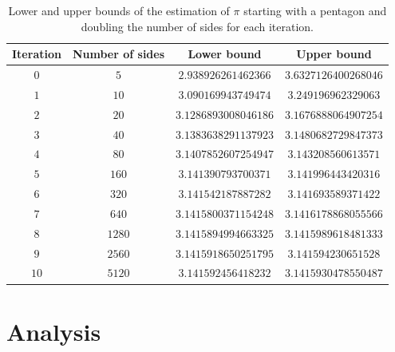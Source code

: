 \documentclass{article}
\begin{document}
\begin{table}[ht]
    \centering
    \begin{tabular}{ |c|c|c|c| }
    \hline
        Iteration&Number of sides&Lower bound&Upper bound \\
        \hline
        $0$ & $5$ & $2.938926261462366$ & $3.6327126400268046$ \\
        \hline
        $1$ & $10$ & $3.090169943749474$ & $3.249196962329063$ \\
        \hline
        $2$ & $20$ & $3.1286893008046186$ & $3.1676888064907254$ \\
        \hline
        $3$ & $40$ & $3.1383638291137923$ & $3.1480682729847373$ \\
        \hline
        $4$ & $80$ & $3.1407852607254947$ & $3.143208560613571$ \\
        \hline
        $5$ & $160$ & $3.141390793700371$ & $3.141996443420316$ \\
        \hline
        $6$ & $320$ & $3.141542187887282$ & $3.141693589371422$ \\
        \hline
        $7$ & $640$ & $3.1415800371154248$ & $3.1416178868055566$ \\
        \hline
        $8$ & $1280$ & $3.1415894994663325$ & $3.1415989618481333$ \\
        \hline
        $9$ & $2560$ & $3.1415918650251795$ & $3.141594230651528$ \\
        \hline
        $10$ & $5120$ & $3.141592456418232$ & $3.1415930478550487$ \\
        \hline
    \end{tabular}
    \caption{Lower and upper bounds of the estimation of $\pi$ starting with a pentagon and doubling the number of sides for each iteration.}
    \label{table: 2}
\end{table}

\section{Analysis}
\end{document}
